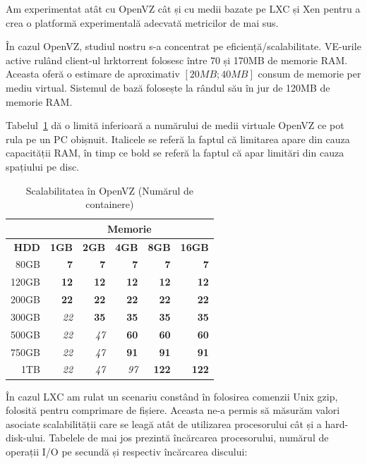 Am experimentat atât cu OpenVZ cât și cu medii bazate pe LXC și Xen pentru
a crea o platformă experimentală adecvată metricilor de mai sus.

În cazul OpenVZ, studiul nostru s-a concentrat pe eficiență/scalabilitate.
VE-urile active rulând client-ul hrktorrent folosesc între 70 și 170MB
de memorie RAM. Aceasta oferă o estimare de aproximativ $[20 MB; 40 MB]$
consum de memorie per mediu virtual. Sistemul de bază folosește la rândul
său în jur de 120MB de memorie RAM.

Tabelul~\ref{table:virt-infra:openvz} dă o limită inferioară a numărului
de medii virtuale OpenVZ ce pot rula pe un PC obișnuit. Italicele se
referă la faptul că limitarea apare din cauza capacității RAM, în timp
ce bold se referă la faptul că apar limitări din cauza spațiului pe disc.

\begin{table}[ht]
  \centering
  \begin{tabular}{|r|r|r|r|r|r|}
    \hline
     & \multicolumn{5}{|c|}{\textbf{Memorie}} \\
    \hline
    \textbf{HDD} & \textbf{1GB} & \textbf{2GB} & \textbf{4GB} & \textbf{8GB} &
    \textbf{16GB} \\
    \hline
    80GB & \textbf{7} & \textbf{7} & \textbf{7} & \textbf{7} &
    \textbf{7} \\
    \hline
    120GB & \textbf{12} & \textbf{12} & \textbf{12} & \textbf{12} &
    \textbf{12} \\
    \hline
    200GB & \textbf{22} & \textbf{22} & \textbf{22} & \textbf{22} &
    \textbf{22} \\
    \hline
    300GB & \textit{22} & \textbf{35} & \textbf{35} & \textbf{35} &
    \textbf{35} \\
    \hline
    500GB & \textit{22} & \textit{47} & \textbf{60} & \textbf{60} &
    \textbf{60} \\
    \hline
    750GB & \textit{22} & \textit{47} & \textbf{91} & \textbf{91} &
    \textbf{91} \\
    \hline
    1TB & \textit{22} & \textit{47} & \textit{97} & \textbf{122} &
    \textbf{122} \\
    \hline
  \end{tabular}
  \caption{Scalabilitatea în OpenVZ (Numărul de containere)}
  \label{table:virt-infra:openvz}
\end{table}

În cazul LXC am rulat un scenariu constând în folosirea comenzii Unix
gzip, folosită pentru comprimare de fișiere. Aceasta ne-a permis să măsurăm
valori asociate scalabilității care se leagă atât de utilizarea procesorului
cât și a hard-disk-ului. Tabelele de mai jos prezintă încărcarea procesorului,
numărul de operații I/O pe secundă și respectiv încărcarea discului:


